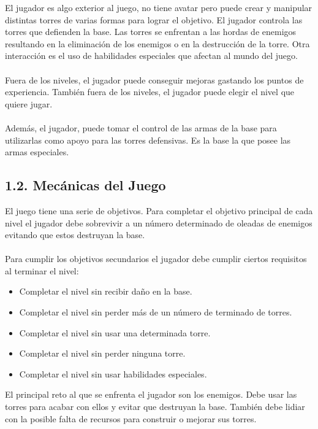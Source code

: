 \documentclass{article}
\begin{document}
\noindent El jugador es algo exterior al juego, no tiene avatar pero puede crear y manipular distintas torres de varias formas para lograr el objetivo. El jugador controla las torres que defienden la base. Las torres se enfrentan a las hordas de enemigos resultando en la eliminación de los enemigos o en la destrucción de la torre. Otra interacción es el uso de habilidades especiales que afectan al mundo del juego.
\\\\
Fuera de los niveles, el jugador puede conseguir mejoras gastando los puntos de experiencia. También fuera de los niveles, el jugador puede elegir el nivel que quiere jugar.
\\\\
Además, el jugador, puede tomar el control de las armas de la base para utilizarlas como apoyo para las torres defensivas. Es la base la que posee las armas especiales.

\subsection{1.2. Mecánicas del Juego}

\noindent El juego tiene una serie de objetivos. Para completar el objetivo principal de cada nivel el jugador debe sobrevivir a un número determinado de oleadas de enemigos evitando que estos destruyan la base.
\\\\
Para cumplir los objetivos secundarios el jugador debe cumplir ciertos requisitos al terminar el nivel:

\clearpage

\begin{itemize}
    \item Completar el nivel sin recibir daño en la base.
    \item Completar el nivel sin perder más de un número de terminado de torres.
    \item Completar el nivel sin usar una determinada torre.
    \item Completar el nivel sin perder ninguna torre.
    \item Completar el nivel sin usar habilidades especiales.
\end{itemize}

\noindent El principal reto al que se enfrenta el jugador son los enemigos. Debe usar las torres para acabar con ellos y evitar que destruyan la base. También debe lidiar con la posible falta de recursos para construir o mejorar sus torres.
\end{document}
